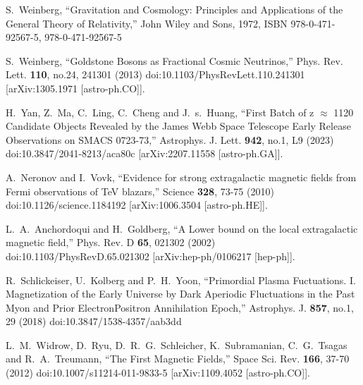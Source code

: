 \documentclass[universe,article,submit,moreauthors,pdftex,a4paper]{Definitions/mdpi}
\begin{document}
\begin{thebibliography}{99}
S.~Weinberg,
``Gravitation and Cosmology: Principles and Applications of the General Theory of Relativity,''
John Wiley and Sons, 1972,
ISBN 978-0-471-92567-5, 978-0-471-92567-5

S.~Weinberg,
``Goldstone Bosons as Fractional Cosmic Neutrinos,''
Phys. Rev. Lett. \textbf{110}, no.24, 241301 (2013)
doi:10.1103/PhysRevLett.110.241301
[arXiv:1305.1971 [astro-ph.CO]].

H.~Yan, Z.~Ma, C.~Ling, C.~Cheng and J.~s.~Huang,
``First Batch of z \ensuremath{\approx} 11\textendash{}20 Candidate Objects Revealed by the James Webb Space Telescope Early Release Observations on SMACS 0723-73,''
Astrophys. J. Lett. \textbf{942}, no.1, L9 (2023)
doi:10.3847/2041-8213/aca80c
[arXiv:2207.11558 [astro-ph.GA]].

A.~Neronov and I.~Vovk,
``Evidence for strong extragalactic magnetic fields from Fermi observations of TeV blazars,''
Science \textbf{328}, 73-75 (2010)
doi:10.1126/science.1184192
[arXiv:1006.3504 [astro-ph.HE]].

L.~A.~Anchordoqui and H.~Goldberg,
``A Lower bound on the local extragalactic magnetic field,''
Phys. Rev. D \textbf{65}, 021302 (2002)
doi:10.1103/PhysRevD.65.021302
[arXiv:hep-ph/0106217 [hep-ph]].

R.~Schlickeiser, U.~Kolberg and P.~H.~Yoon,
``Primordial Plasma Fuctuations. I. Magnetization of the Early Universe by Dark Aperiodic Fluctuations in the Past Myon and Prior Electron\textendash{}Positron Annihilation Epoch,''
Astrophys. J. \textbf{857}, no.1, 29 (2018)
doi:10.3847/1538-4357/aab3dd

L.~M.~Widrow, D.~Ryu, D.~R.~G.~Schleicher, K.~Subramanian, C.~G.~Tsagas and R.~A.~Treumann,
``The First Magnetic Fields,''
Space Sci. Rev. \textbf{166}, 37-70 (2012)
doi:10.1007/s11214-011-9833-5
[arXiv:1109.4052 [astro-ph.CO]].


\end{thebibliography}
\end{document}
